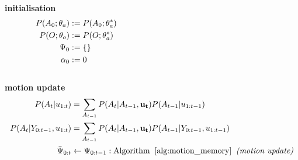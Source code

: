 \documentclass{frontiersSCNS} %
\let\oldnl\nl%
\newcommand{\nonl}{\renewcommand{\nl}{\let\nl\oldnl}}%
\begin{document}
\begin{center}
\begin{minipage}{\linewidth}
\begin{algorithm}[H]
\label{alg:mrf-slam}
\nonl\hrulefill	
\BlankLine
\nonl\textbf{initialisation}\\
\vspace*{-0.5cm}
\nonl\begin{align}
P(A_0;\theta_a) &:= P(A_0;\theta^*_a) \hspace*{6.5cm} \nonumber \\
P(O;\theta_o) &:= P(O;\theta^*_a)\nonumber \\
\Psi_0 &:= \{\}\nonumber\\
\alpha_0 &:= 0 \nonumber
\end{align}
\vspace*{-1cm}
\BlankLine
\nonl\hrulefill	\\
\nonl\textbf{motion update}\\
\vspace*{-0.5cm}
\nonl\begin{align}
P(A_t|u_{1:t})  	 &= \sum\limits_{A_{t-1}} P(A_t|A_{t-1},\mathbf{u_t})  P(A_{t-1}|u_{1:t-1}) \nonumber \\
P(A_t|Y_{0:t-1},u_{1:t}) &= \sum\limits_{A_{t-1}} P(A_t|A_{t-1},\mathbf{u_t})  P(A_{t-1}|Y_{0:t-1},u_{1:t-1}) \nonumber \\
\bar{\Psi}_{0:t} 	 &\gets \Psi_{0:t-1}: \mathrm{ Algorithm\;\; \ref{alg:motion_memory}\;\; \textit{(motion update)}} \nonumber
\end{align}
\vspace*{-1cm}
\BlankLine
\nonl\hrulefill	\\

\end{algorithm}
\end{minipage}
\end{center}
\end{document}
